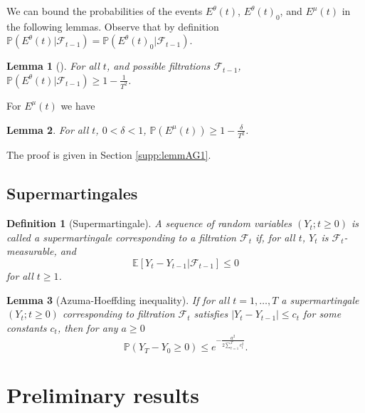 \documentclass{article}
\newtheorem{definition}{Definition}
\newtheorem{lemma}{Lemma}
\begin{document}
\begin{appendices}
We can bound the probabilities of the events $E^\theta(t)$, $E^\theta(t)_0$, and $E^\mu(t)$ in the following lemmas. Observe that by definition $\mathbb{P}(E^\theta(t)|\mathcal{F}_{t-1}) = \mathbb{P}(E^\theta(t)_0|\mathcal{F}_{t-1})$.

\begin{lemma}[\cite{agrawal2013thompson}]
\label{lemm:eoth}
For all $t$, and possible filtrations $\mathcal{F}_{t-1}$, $\mathbb{P}(E^\theta(t)|\mathcal{F}_{t-1}) \geq 1 - \frac{1}{T^2}$. 
\end{lemma}
For $E^\mu(t)$ we have
\begin{lemma}\label{lemm:AG1}
For all $t$, $0 < \delta < 1$, $\mathbb{P}(E^\mu(t)) \geq 1 - \frac{\delta}{T^2}$. 
\end{lemma}
The proof is given in Section \ref{supp:lemmAG1}. 
\subsection{Supermartingales}
\label{supp:AzHo}
\begin{definition}[Supermartingale]
A sequence of random variables $(Y_t;t \geq 0)$ is called a supermartingale corresponding to a filtration $\mathcal{F}_{t}$ if, for all $t$, $Y_t$ is $\mathcal{F}_t$-measurable, and 
\[
\mathbb{E}[Y_t - Y_{t-1} | \mathcal{F}_{t-1}] \leq 0
\]
for all $t \geq 1$.
\end{definition}
\begin{lemma}[Azuma-Hoeffding inequality]
If for all $t = 1 ,\dots, T$ a supermartingale $(Y_t;t \geq 0)$ corresponding to filtration $\mathcal{F}_t$ satisfies $|Y_t - Y_{t-1}| \leq c_t$ for some constants $c_t$, then for any $a \geq 0$
\[
\mathbb{P}(Y_T - Y_0 \geq 0) \leq e^{- \frac{a^2}{2 \sum_{t=1}^T c_t^2}}.
\]
\end{lemma}


\section{Preliminary results}

\end{appendices}
\end{document}
